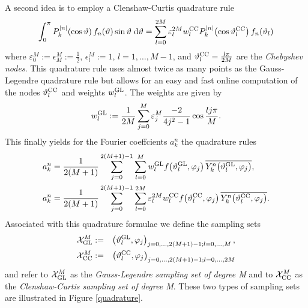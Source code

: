 A second idea is to employ a Clenshaw-Curtis quadrature rule
$$
  \int_{0}^{\pi} P_{k}^{\left\vert n\right\vert}{\hspace{-0.4ex}}\left(\cos \vartheta\right) f_{n}{\hspace{-0.4ex}}\left(\vartheta\right) \sin \vartheta \; \text{\rm{d}} \vartheta = \sum_{l=0}^{2M} \varepsilon_{l}^{2M} w_{l}^{\mbox{\scriptsize\rm{CC}}} P_{k}^{\left\vert n\right\vert}{\hspace{-0.4ex}}\left(\cos \vartheta_{l}^{\mbox{\scriptsize\rm{CC}}}\right) f_{n}{\hspace{-0.4ex}}\left(\vartheta_{l}\right)
$$
where $\varepsilon_{0}^{M} := \epsilon_{M}^M := \frac{1}{2}$, $\epsilon_{l}^M := 1$, $l=1,\dots,M-1$, and $\vartheta_{l}^{\mbox{\scriptsize\rm{CC}}} = \frac{l\pi}{2M}$ are the \emph{Chebyshev nodes}.
This quadrature rule uses almost twice as many points as the Gauss-Legendre quadrature rule but allows for an easy and fast online computation of the nodes $\vartheta_{l}^{\mbox{\scriptsize\rm{CC}}}$
and weights $w_{l}^{\mbox{\scriptsize\rm{GL}}}$. The weights are given by
$$ w_{l}^{\mbox{\scriptsize\rm{GL}}} := \frac{1}{2M} \sum_{j=0}^{M} \varepsilon_{j}^{M} \frac{-2}{4j^2-1} \cos\frac{lj\pi}{M}.$$
This finally yields for the Fourier coeffcients $a_{k}^n$ the quadrature rules 
\begin{equation}
  \label{NFSFT:iDSFT}
  \begin{split}
    a_{k}^n & = \frac{1}{2(M+1)} \sum_{j=0}^{2(M+1)-1} \sum_{l=0}^{M} w_{l}^{\mbox{\scriptsize\rm{GL}}} f{\hspace{-0.4ex}}\left(\vartheta_{l}^{\mbox{\scriptsize\rm{GL}}},\varphi_{j}\right) \overline{Y_{k}^n{\hspace{-0.4ex}}\left(\vartheta_{l}^{\mbox{\scriptsize\rm{GL}}},\varphi_{j}\right)},\\
    a_{k}^n & = \frac{1}{2(M+1)} \sum_{j=0}^{2(M+1)-1} \sum_{l=0}^{2M} \varepsilon_{l}^{2M} w_{l}^{\mbox{\scriptsize\rm{CC}}} f{\hspace{-0.4ex}}\left(\vartheta_{l}^{\mbox{\scriptsize\rm{CC}}},\varphi_{j}\right) 
  \overline{Y_{k}^n{\hspace{-0.4ex}}\left(\vartheta_{l}^{\mbox{\scriptsize\rm{CC}}},\varphi_{j}\right)}.
  \end{split}
\end{equation}
Associated with this quadrature formulae we define the sampling sets
\begin{eqnarray*}
  \mathcal{X}_{\mbox{\scriptsize\rm{GL}}}^M & := & \left(\vartheta_{l}^{\mbox{\scriptsize\rm{GL}}},\varphi_{j}\right)_{j=0,\dots,2(M+1)-1;l=0,\dots,M},\\
  \mathcal{X}_{\mbox{\scriptsize\rm{CC}}}^M & := & \left(\vartheta_{l}^{\mbox{\scriptsize\rm{CC}}},\varphi_{j}\right)_{j=0,\dots,2(M+1)-1;l=0,\dots,2M}
\end{eqnarray*}
and refer to $\mathcal{X}_{\mbox{\scriptsize\rm{GL}}}^M$ as the \emph{Gauss-Legendre sampling set of degree M} and to $\mathcal{X}_{\mbox{\scriptsize\rm{CC}}}^M$ as the 
\emph{Clenshaw-Curtis sampling set of degree M}. These two types of sampling sets are illustrated in Figure \ref{quadrature}.

